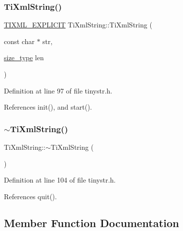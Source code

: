 \hypertarget{class_ti_xml_string_a4b17ea5c5db986f14827223dfa8f1547}{}\label{class_ti_xml_string_a4b17ea5c5db986f14827223dfa8f1547} 
\subsubsection{\texorpdfstring{Ti\+Xml\+String()}{TiXmlString()}\hspace{0.1cm}{\footnotesize\ttfamily [4/4]}}
{\footnotesize\ttfamily \hyperlink{tinystr_8h_ae341476cd6b94ee32e3e93110a759581}{T\+I\+X\+M\+L\+\_\+\+E\+X\+P\+L\+I\+C\+IT} Ti\+Xml\+String\+::\+Ti\+Xml\+String (\begin{DoxyParamCaption}\item[{const char $\ast$}]{str,  }\item[{\hyperlink{class_ti_xml_string_abeb2c1893a04c17904f7c06546d0b971}{size\+\_\+type}}]{len }\end{DoxyParamCaption})\hspace{0.3cm}{\ttfamily [inline]}}



Definition at line 97 of file tinystr.\+h.



References init(), and start().

\hypertarget{class_ti_xml_string_a7ac03f581ca3422c4808162ab14f3450}{}\label{class_ti_xml_string_a7ac03f581ca3422c4808162ab14f3450} 
\subsubsection{\texorpdfstring{$\sim$\+Ti\+Xml\+String()}{~TiXmlString()}}
{\footnotesize\ttfamily Ti\+Xml\+String\+::$\sim$\+Ti\+Xml\+String (\begin{DoxyParamCaption}{ }\end{DoxyParamCaption})\hspace{0.3cm}{\ttfamily [inline]}}



Definition at line 104 of file tinystr.\+h.



References quit().



\subsection{Member Function Documentation}
\hypertarget{class_ti_xml_string_a717b00190c8acdee94816d2f4f20e75a}{}\label{class_ti_xml_string_a717b00190c8acdee94816d2f4f20e75a} 
